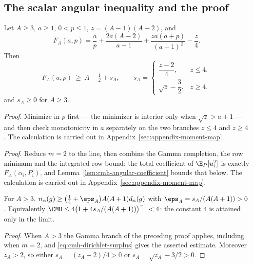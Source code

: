 \documentclass[../../main.tex]{subfiles}
\begin{document}
\subsection{The scalar angular inequality and the proof}
\label{subsec:cmh-dirichlet-proof}

\begin{lemma}
\label{lem:cmh-angular-coefficient}
Let $A\ge3$, $a\ge1$, $0<p\le1$, $z=(A-1)(A-2)$, and
\begin{equation}
  F_A(a,p)=\frac ap+\frac{2a(A-2)}{a+1}+\frac{za(a+p)}{(a+1)^2}-\frac z4 .
  \label{eq:cmh-FA}
\end{equation}
Then
\begin{equation}
  F_A(a,p)\ \ge\ A-\tfrac12+s_A,
  \qquad
  s_A=\begin{cases}\dfrac{z-2}4,&z\le4,\\[6pt]\sqrt z-\dfrac32,&z\ge4,\end{cases}
  \label{eq:cmh-FA-min}
\end{equation}
and $s_A\ge0$ for $A\ge3$.
\end{lemma}

\noindent\emph{Proof.} Minimize in $p$ first --- the minimizer is interior only when $\sqrt z>a+1$ --- and then check monotonicity in $a$ separately on the two branches $z\le4$ and $z\ge4$. The calculation is carried out in Appendix~\ref{sec:appendix-moment-map}.

\noindent\emph{Proof.} Reduce $m=2$ to the line, then combine the Gamma completion, the row minimum and the integrated row bound: the total coefficient of $\E_P[u_i^2]$ is exactly $F_A(\alpha_i,P_i)$, and Lemma~\ref{lem:cmh-angular-coefficient} bounds that below. The calculation is carried out in Appendix~\ref{sec:appendix-moment-map}.

\begin{corollary}
\label{cor:cmh-dirichlet-surplus}
For $A>3$, $n_\alpha(g)\ge\bigl(\tfrac14+\eps_A\bigr)A(A+1)d_\alpha(g)$ with
$\eps_A=s_A/(A(A+1))>0$. Equivalently
$\CMH\le4\bigl(1+4s_A/(A(A+1))\bigr)^{-1}<4$: the constant $4$ is attained only in the limit.
\end{corollary}

\begin{proof}
When $A>3$ the Gamma branch of the preceding proof applies, including when $m=2$, and
\eqref{eq:cmh-dirichlet-surplus} gives the asserted estimate. Moreover $z_A>2$, so either
$s_A=(z_A-2)/4>0$ or $s_A=\sqrt{z_A}-3/2>0$.
\end{proof}
\end{document}
